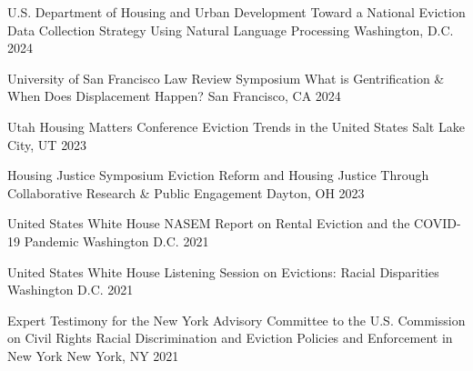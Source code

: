 


\begin{cventries}

  \cventry
    {U.S. Department of Housing and Urban Development} %
    {Toward a National Eviction Data Collection Strategy Using Natural Language Processing} %
    {Washington, D.C.} %
    {2024} %
    {}

  \cventry
    {University of San Francisco Law Review Symposium} %
    {What is Gentrification \& When Does Displacement Happen?} %
    {San Francisco, CA} %
    {2024} %
    {}
    
  \cventry
    {Utah Housing Matters Conference} %
    {Eviction Trends in the United States} %
    {Salt Lake City, UT} %
    {2023} %
    {}

  \cventry
    {Housing Justice Symposium} %
    {Eviction Reform and Housing Justice Through Collaborative Research \& Public Engagement} %
    {Dayton, OH} %
    {2023} %
    {}

  \cventry
    {United States White House} %
    {NASEM Report on Rental Eviction and the COVID-19 Pandemic} %
    {Washington D.C.} %
    {2021} %
    {}

  \cventry
    {United States White House} %
    {Listening Session on Evictions: Racial Disparities} %
    {Washington D.C.} %
    {2021} %
    {}

  \cventry
    {Expert Testimony for the New York Advisory Committee to the U.S. Commission on Civil Rights} %
    {Racial Discrimination and Eviction Policies and Enforcement in New York} %
    {New York, NY} %
    {2021} %
    {}


\end{cventries}
